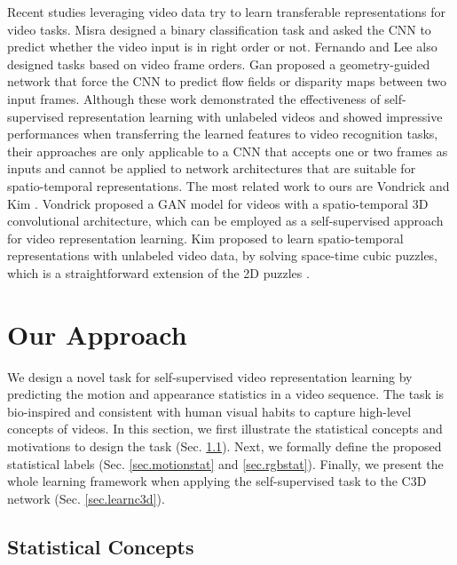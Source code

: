 \documentclass[10pt,twocolumn,letterpaper]{article}
\begin{document}
Recent studies leveraging video data try to learn transferable representations for video tasks. 
Misra \etal \cite{misra2016shuffle} designed a binary classification task and asked the CNN to predict whether the video input is in right order or not. Fernando \etal \cite{fernando2017self} and Lee \etal \cite{lee2017unsupervised} also designed tasks based on video frame orders. 
Gan \etal  \cite{gan2018geometry} proposed a geometry-guided network that force the CNN to predict flow fields or disparity maps between two input frames. Although these work demonstrated the effectiveness of self-supervised representation learning with unlabeled videos and showed impressive performances when transferring the learned features to video recognition tasks, their approaches are only applicable to a CNN that accepts one or two frames as inputs and cannot be applied to network architectures that are suitable for spatio-temporal representations. 
The most related work to ours are Vondrick \etal \cite{vondrick2016generating} and Kim \etal \cite{kim2018self}. 
Vondrick \etal \cite{vondrick2016generating} proposed a GAN model for videos with a spatio-temporal 3D convolutional architecture, which can be employed as a self-supervised approach for video representation learning.
Kim \etal \cite{kim2018self} proposed to learn spatio-temporal representations with unlabeled video data, by solving space-time cubic puzzles, which is a straightforward extension of the 2D puzzles \cite{noroozi2016unsupervised}.



\section{Our Approach}

We design a novel task for self-supervised video representation learning by predicting the motion and appearance statistics in a video sequence. 
The task is bio-inspired and consistent with human visual habits \cite{giese2003cognitive} to capture high-level concepts of videos.
In this section, we first illustrate the statistical concepts and motivations to design the task (Sec. \ref{sec.concept}). 
Next, we formally define the proposed statistical labels (Sec. \ref{sec.motionstat} and \ref{sec.rgbstat}). 
Finally, we present the whole learning framework when applying the self-supervised task to the C3D \cite{tran2015learning} network (Sec. \ref{sec.learnc3d}). 



\subsection{Statistical Concepts}\label{sec.concept}
\end{document}

